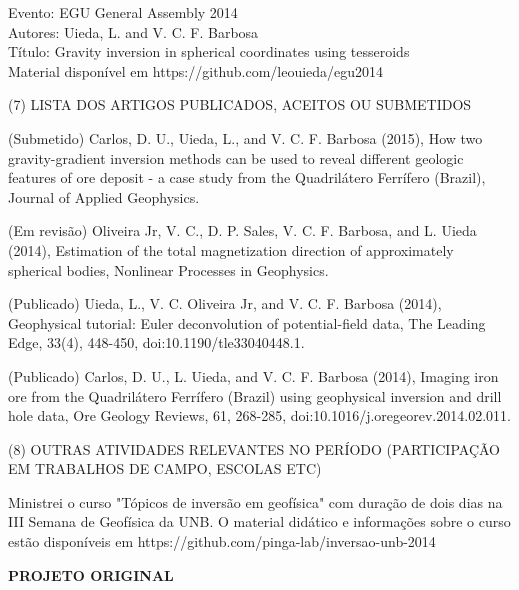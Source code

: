 \documentclass[12pt,a4paper]{article}
\begin{document}
\begin{flushleft}
\bigskip

Evento: EGU General Assembly 2014\\
Autores: Uieda, L. and V. C. F. Barbosa\\
Título: Gravity inversion in spherical coordinates using tesseroids\\
Material disponível em https://github.com/leouieda/egu2014

\bigskip

\noindent (7) LISTA DOS ARTIGOS PUBLICADOS, ACEITOS OU SUBMETIDOS

\bigskip

(Submetido) Carlos, D. U., Uieda, L., and V. C. F. Barbosa (2015),
How two gravity-gradient inversion methods can be used to reveal different
geologic features of ore deposit - a case study from the Quadrilátero
Ferrífero (Brazil),
Journal of Applied Geophysics.

\bigskip

(Em revisão) Oliveira Jr, V. C., D. P. Sales, V. C. F. Barbosa, and L. Uieda (2014),
Estimation of the total magnetization direction of approximately spherical
bodies, Nonlinear Processes in Geophysics.

\bigskip

(Publicado) Uieda, L., V. C. Oliveira Jr, and V. C. F. Barbosa (2014), Geophysical
tutorial: Euler deconvolution of potential-field data, The Leading Edge, 33(4),
448-450, doi:10.1190/tle33040448.1.

\bigskip

(Publicado) Carlos, D. U., L. Uieda, and V. C. F. Barbosa (2014), Imaging iron ore from the
Quadrilátero Ferrífero (Brazil) using geophysical inversion and drill hole
data, Ore Geology Reviews, 61, 268-285, doi:10.1016/j.oregeorev.2014.02.011.

\bigskip

\noindent (8) OUTRAS ATIVIDADES RELEVANTES NO PERÍODO (PARTICIPAÇÃO EM
TRABALHOS DE CAMPO, ESCOLAS ETC)

\bigskip

Ministrei o curso "Tópicos de inversão em geofísica" com duração de dois dias
na III Semana de Geofísica da UNB.
O material didático e informações sobre o curso estão disponíveis em
https://github.com/pinga-lab/inversao-unb-2014


\bigskip

\end{flushleft}


\newpage

\begin{center}\textbf{\large PROJETO ORIGINAL}\end{center}
\end{document}
